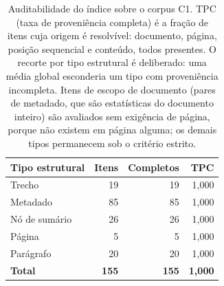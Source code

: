 \begin{table}[htb]
\centering
\caption{Auditabilidade do índice sobre o corpus C1. TPC (taxa de proveniência completa) é a fração de itens cuja origem é resolvível: documento, página, posição sequencial e conteúdo, todos presentes. O recorte por tipo estrutural é deliberado: uma média global esconderia um tipo com proveniência incompleta. Itens de escopo de documento (pares de metadado, que são estatísticas do documento inteiro) são avaliados sem exigência de página, porque não existem em página alguma; os demais tipos permanecem sob o critério estrito.}
\label{tab:provenance}
\begin{tabular}{lrrr}
\toprule
Tipo estrutural & Itens & Completos & TPC \\
\midrule
Trecho & 19 & 19 & 1{,}000 \\
Metadado & 85 & 85 & 1{,}000 \\
Nó de sumário & 26 & 26 & 1{,}000 \\
Página & 5 & 5 & 1{,}000 \\
Parágrafo & 20 & 20 & 1{,}000 \\
\midrule
\textbf{Total} & \textbf{155} & \textbf{155} & \textbf{1{,}000} \\
\bottomrule
\end{tabular}
\end{table}
